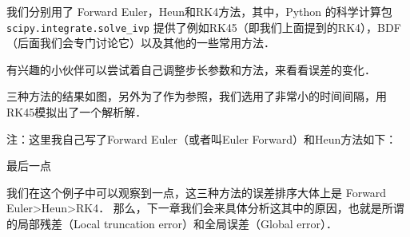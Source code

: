 我们分别用了 Forward Euler，Heun和RK4方法，其中，Python 的科学计算包 \verb|scipy.integrate.solve_ivp|   提供了例如RK45（即我们上面提到的RK4），BDF（后面我们会专门讨论它）以及其他的一些常用方法．

有兴趣的小伙伴可以尝试着自己调整步长参数和方法，来看看误差的变化．


三种方法的结果如图，另外为了作为参照，我们选用了非常小的时间间隔，用RK45模拟出了一个解析解．

注：这里我自己写了Forward Euler（或者叫Euler Forward）和Heun方法如下：


    
最后一点

我们在这个例子中可以观察到一点，这三种方法的误差排序大体上是 Forward Euler>Heun>RK4． 那么，下一章我们会来具体分析这其中的原因，也就是所谓的局部残差（Local truncation error）和全局误差（Global error）．
